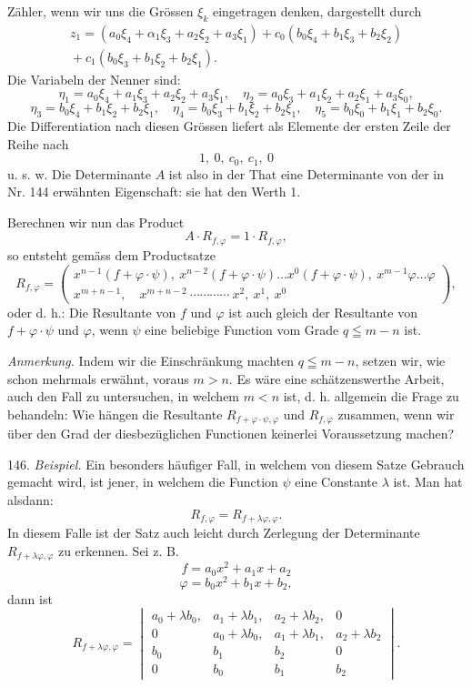 Z\"ahler, wenn wir uns die Gr\"ossen $\xi_k$ eingetragen denken, dargestellt
durch
\[
\begin{aligned}
z_1 = (a_0\xi_4 + \alpha_1\xi_3 + a_2\xi_2 + a_3\xi_1) + c_0(b_0\xi_4 + b_1\xi_3 + b_2\xi_2)\\
{} + c_1(b_0\xi_3 + b_1\xi_2 + b_2\xi_1).
\end{aligned}
\]
Die Variabeln der Nenner sind:
\[
\eta_1 = a_0\xi_4 + a_1\xi_3 + a_2\xi_2 + a_3\xi_1,\quad
\eta_2 = a_0\xi_3 + a_1\xi_2 + a_2\xi_1 + a_3\xi_0,
\]
\[
\eta_3 = b_0\xi_4 + b_1\xi_2 + b_2\xi_1,\quad
\eta_4 = b_0\xi_3 + b_1\xi_2 + b_2\xi_1,\quad
\eta_5 = b_0\xi_0 + b_1\xi_1 + b_2\xi_0.
\]
Die Differentiation nach diesen Gr\"ossen liefert als Elemente der ersten
Zeile der Reihe nach
\[
1,\ 0,\ c_0,\ c_1,\ 0
\]
u. s. w. Die Determinante $A$ ist also in der That eine Determinante
von der in Nr. 144 erw\"ahnten Eigenschaft: sie hat den Werth 1.

Berechnen wir nun das Product
\[
A \cdot R_{f,\varphi} = 1 \cdot R_{f,\varphi},
\]
so entsteht gem\"ass dem Productsatze
\[
R_{f,\varphi} = \left(\begin{array}{l}
x^{n-1}(f+\varphi\cdot\psi),\ x^{n-2}(f+\varphi\cdot\psi)\ldots x^0(f+\varphi\cdot\psi),\ x^{m-1}\varphi\ldots\varphi\\[2pt]
x^{m+n-1},\quad x^{m+n-2}\ \cdots\cdots\cdots\cdots\ x^2,\ x^1,\ x^0
\end{array}\right),
\]
oder
d. h.: \glqq Die Resultante von $f$ und $\varphi$ ist auch gleich der
Resultante von $f+\varphi\cdot\psi$ und $\varphi$, wenn $\psi$ eine
beliebige Function vom Grade $q\leqq m-n$ ist.\grqq{}

\textit{Anmerkung.} Indem wir die Einschr\"ankung machten $q\leqq m-n$,
setzen wir, wie schon mehrmals erw\"ahnt, voraus $m>n$. Es w\"are
eine sch\"atzenswerthe Arbeit, auch den Fall zu untersuchen, in welchem
$m<n$ ist, d. h. allgemein die Frage zu behandeln: Wie h\"angen die
Resultante $R_{f+\varphi\cdot\psi,\varphi}$ und $R_{f,\varphi}$ zusammen,
wenn wir \"uber den Grad der diesbez\"uglichen Functionen keinerlei
Voraussetzung machen?

146. \textit{Beispiel.} Ein besonders h\"aufiger Fall, in welchem von
diesem Satze Gebrauch gemacht wird, ist jener, in welchem die Function
$\psi$ eine Constante $\lambda$ ist. Man hat alsdann:
\[
R_{f,\varphi} = R_{f+\lambda\varphi,\varphi}.
\]
In diesem Falle ist der Satz auch leicht durch Zerlegung der
Determinante $R_{f+\lambda\varphi,\varphi}$ zu erkennen. Sei z. B.
\[
f = a_0x^2 + a_1x + a_2
\]
\[
\varphi = b_0x^2 + b_1x + b_2,
\]
dann ist
\[
R_{f+\lambda\varphi,\varphi} = \begin{vmatrix}
a_0+\lambda b_0, & a_1+\lambda b_1, & a_2+\lambda b_2, & 0\\
0 & a_0+\lambda b_0, & a_1+\lambda b_1, & a_2+\lambda b_2\\
b_0 & b_1 & b_2 & 0\\
0 & b_0 & b_1 & b_2
\end{vmatrix}.
\]


